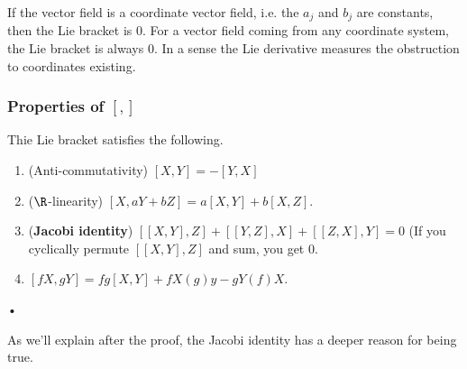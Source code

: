 If the vector field is a coordinate vector field, i.e. the $a_j$ and $b_j$ are constants, then the Lie bracket is 0. For a vector field coming from any coordinate system, the Lie bracket is always 0. In a sense the Lie derivative measures the obstruction to coordinates existing.
\subsubsection{Properties of $[,]$}
\begin{pr}
Thie Lie bracket satisfies the following.
\begin{enumerate}
\item
(Anti-commutativity) $[X,Y]=-[Y,X]$
\item
($\R$-linearity) $[X,aY+bZ]=a[X,Y]+b[X,Z]$.
\item
(\textbf{Jacobi identity}) %
$[[X,Y],Z]+[[Y,Z],X]+[[Z,X],Y]=0$ (If you cyclically permute $[[X,Y],Z]$ and sum, you get 0.
\item
$[fX,gY]=fg[X,Y]+fX(g)y-gY(f)X$.
\end{enumerate}•
\end{pr}
As we'll explain after the proof, the Jacobi identity has a deeper reason for being true.
